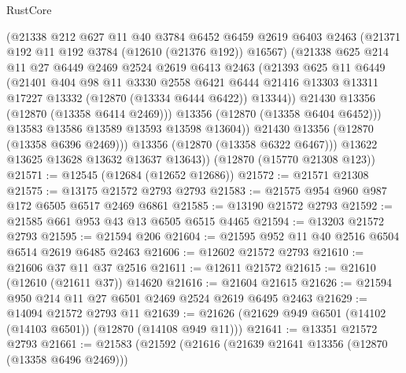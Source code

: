 \begin{lexlean}{RustCore}
\begin{coremodule}
                (@21338
                  @212
                  @627
                  @11
                  @40
                  @3784
                  @6452
                  @6459
                  @2619
                  @6403
                  @2463
                  (@21371 @192 @11 @192 @3784 (@12610 (@21376 @192)) @16567)
                  (@21338
                    @625
                    @214
                    @11
                    @27
                    @6449
                    @2469
                    @2524
                    @2619
                    @6413
                    @2463
                    (@21393
                      @625
                      @11
                      @6449
                      (@21401
                        @404
                        @98
                        @11
                        @3330
                        @2558
                        @6421
                        @6444
                        @21416
                        @13303
                        @13311
                        @17227
                        @13332
                        (@12870 (@13334 @6444 @6422))
                        @13344))
                    @21430
                    @13356
                    (@12870 (@13358 @6414 @2469)))
                  @13356
                  (@12870 (@13358 @6404 @6452)))
                @13583
                @13586
                @13589
                @13593
                @13598
                @13604))
            @21430
            @13356
            (@12870 (@13358 @6396 @2469)))
          @13356
          (@12870 (@13358 @6322 @6467)))
        @13622
        @13625
        @13628
        @13632
        @13637
        @13643))
    (@12870 (@15770 @21308 @123))
@21571 := @12545 (@12684 (@12652 @12686))
@21572 := @21571 @21308
@21575 := @13175 @21572 @2793 @2793
@21583 := @21575 @954 @960 @987 @172 @6505 @6517 @2469 @6861
@21585 := @13190 @21572 @2793
@21592 := @21585 @661 @953 @43 @13 @6505 @6515 @4465
@21594 := @13203 @21572 @2793
@21595 := @21594 @206
@21604 := @21595 @952 @11 @40 @2516 @6504 @6514 @2619 @6485 @2463
@21606 := @12602 @21572 @2793
@21610 := @21606 @37 @11 @37 @2516
@21611 := @12611 @21572
@21615 := @21610 (@12610 (@21611 @37)) @14620
@21616 := @21604 @21615
@21626 := @21594 @950 @214 @11 @27 @6501 @2469 @2524 @2619 @6495 @2463
@21629 := @14094 @21572 @2793 @11
@21639 := @21626 (@21629 @949 @6501 (@14102 (@14103 @6501)) (@12870 (@14108 @949 @11)))
@21641 := @13351 @21572 @2793
@21661 := @21583
    (@21592
      (@21616
        (@21639 @21641 @13356 (@12870 (@13358 @6496 @2469)))

\end{coremodule}
\end{lexlean}

